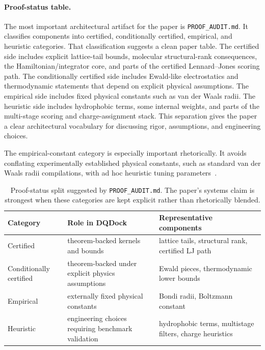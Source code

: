 \paragraph{Proof-status table.}
The most important architectural artifact for the paper is \texttt{PROOF\_AUDIT.md}. It classifies components into certified, conditionally certified, empirical, and heuristic categories. That classification suggests a clean paper table. The certified side includes explicit lattice-tail bounds, molecular structural-rank consequences, the Hamiltonian/integrator core, and parts of the certified Lennard--Jones scoring path. The conditionally certified side includes Ewald-like electrostatics and thermodynamic statements that depend on explicit physical assumptions. The empirical side includes fixed physical constants such as van der Waals radii. The heuristic side includes hydrophobic terms, some internal weights, and parts of the multi-stage scoring and charge-assignment stack. This separation gives the paper a clear architectural vocabulary for discussing rigor, assumptions, and engineering choices.

The empirical-constant category is especially important rhetorically. It avoids conflating experimentally established physical constants, such as standard van der Waals radii compilations, with ad hoc heuristic tuning parameters~\cite{bondi1964}.

\begin{table}[t]
\centering
\small
\begin{tabular}{@{}lll@{}}
\toprule
\textbf{Category} & \textbf{Role in DQDock} & \textbf{Representative components} \\
\midrule
Certified & theorem-backed kernels and bounds & lattice tails, structural rank, certified LJ path \\
Conditionally certified & theorem-backed under explicit physics assumptions & Ewald pieces, thermodynamic lower bounds \\
Empirical & externally fixed physical constants & Bondi radii, Boltzmann constant \\
Heuristic & engineering choices requiring benchmark validation & hydrophobic terms, multistage filters, charge heuristics \\
\bottomrule
\end{tabular}
\caption{Proof-status split suggested by \texttt{PROOF\_AUDIT.md}. The paper's systems claim is strongest when these categories are kept explicit rather than rhetorically blended.}
\end{table}
